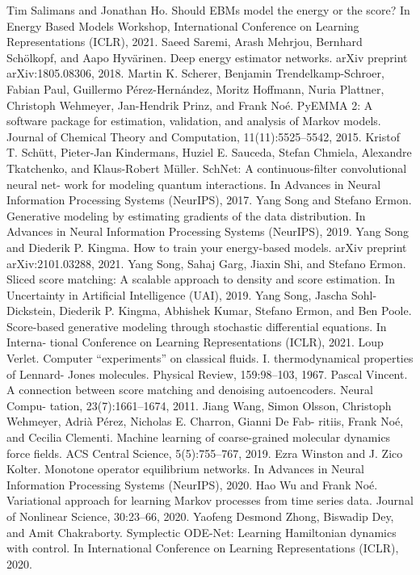 \documentclass{article}
\begin{document}
Tim Salimans and Jonathan Ho. Should EBMs model the energy or the score? In Energy Based
Models Workshop, International Conference on Learning Representations (ICLR), 2021.
Saeed Saremi, Arash Mehrjou, Bernhard Sch\"olkopf, and Aapo Hyv\"arinen. Deep energy estimator
networks. arXiv preprint arXiv:1805.08306, 2018.
Martin K. Scherer, Benjamin Trendelkamp-Schroer, Fabian Paul, Guillermo P\'erez-Hern\'andez,
Moritz Hoffmann, Nuria Plattner, Christoph Wehmeyer, Jan-Hendrik Prinz, and Frank No\'e.
PyEMMA 2: A software package for estimation, validation, and analysis of Markov models.
Journal of Chemical Theory and Computation, 11(11):5525--5542, 2015.
Kristof T. Sch\"utt, Pieter-Jan Kindermans, Huziel E. Sauceda, Stefan Chmiela, Alexandre
Tkatchenko, and Klaus-Robert M\"uller. SchNet: A continuous-filter convolutional neural net-
work for modeling quantum interactions. In Advances in Neural Information Processing Systems
(NeurIPS), 2017.
Yang Song and Stefano Ermon. Generative modeling by estimating gradients of the data distribution.
In Advances in Neural Information Processing Systems (NeurIPS), 2019.
Yang Song and Diederik P. Kingma.
How to train your energy-based models.
arXiv preprint
arXiv:2101.03288, 2021.
Yang Song, Sahaj Garg, Jiaxin Shi, and Stefano Ermon. Sliced score matching: A scalable approach
to density and score estimation. In Uncertainty in Artificial Intelligence (UAI), 2019.
Yang Song, Jascha Sohl-Dickstein, Diederik P. Kingma, Abhishek Kumar, Stefano Ermon, and Ben
Poole. Score-based generative modeling through stochastic differential equations. In Interna-
tional Conference on Learning Representations (ICLR), 2021.
Loup Verlet. Computer ``experiments'' on classical fluids. I. thermodynamical properties of Lennard-
Jones molecules. Physical Review, 159:98--103, 1967.
Pascal Vincent. A connection between score matching and denoising autoencoders. Neural Compu-
tation, 23(7):1661--1674, 2011.
Jiang Wang, Simon Olsson, Christoph Wehmeyer, Adrià P\'erez, Nicholas E. Charron, Gianni De Fab-
ritiis, Frank No\'e, and Cecilia Clementi. Machine learning of coarse-grained molecular dynamics
force fields. ACS Central Science, 5(5):755--767, 2019.
Ezra Winston and J. Zico Kolter. Monotone operator equilibrium networks. In Advances in Neural
Information Processing Systems (NeurIPS), 2020.
Hao Wu and Frank No\'e. Variational approach for learning Markov processes from time series data.
Journal of Nonlinear Science, 30:23--66, 2020.
Yaofeng Desmond Zhong, Biswadip Dey, and Amit Chakraborty. Symplectic ODE-Net: Learning
Hamiltonian dynamics with control. In International Conference on Learning Representations
(ICLR), 2020.
\clearpage
\end{document}
